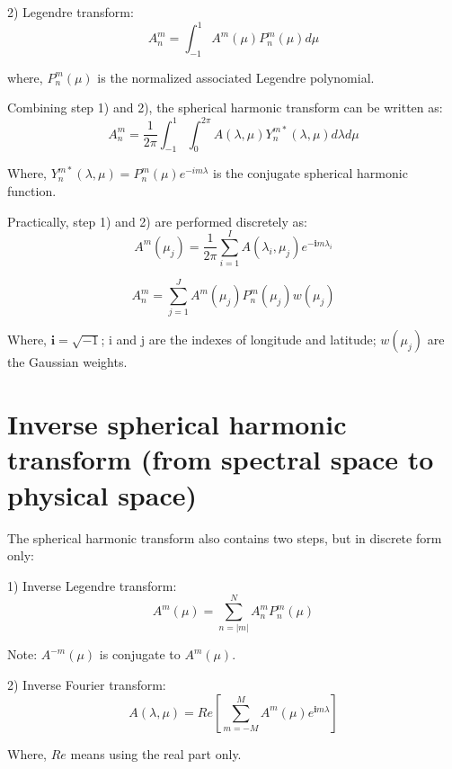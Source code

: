\documentclass[12pt,a4paper]{book}
\begin{document}
2) Legendre transform:
	\begin{equation} \label{eq:legendre}
	A_n^m = \int_{-1}^1 A^m(\mu) P_n^m(\mu) d\mu
	\end{equation}

where, $P_n^m(\mu)$ is the normalized associated Legendre polynomial.

Combining step 1) and 2), the spherical harmonic transform can be written as:
	\begin{equation} \label{eq:harmonic}
	A_n^m = \frac{1}{2\pi} \int_{-1}^1 \int_0^{2\pi} A(\lambda, \mu ) Y_n^{m*}(\lambda, \mu) d\lambda d\mu
	\end{equation} 

Where, $Y_n^{m*}(\lambda, \mu) = P_n^m(\mu ) e^{-im\lambda}$ is the conjugate spherical harmonic function.

Practically, step 1) and 2) are performed discretely as:
	\begin{equation} \label{eq:disfft}
		A^m(\mu_j) = \frac{1}{2\pi} \sum_{i=1}^I A(\lambda_i, \mu_j) e^{-\textbf{i}m\lambda_i}
	\end{equation}	
	
	\begin{equation} \label{eq:dislegendre}
		A_n^m = \sum_{j=1}^J A^m(\mu_j) P_n^m(\mu_j) w(\mu_j)
	\end{equation}

Where, $\textbf{i} = \sqrt{-1}$;  i and j are the indexes of longitude and latitude; $w(\mu_j)$ are the Gaussian weights.

\section{Inverse spherical harmonic transform (from spectral space to physical space)}

The spherical harmonic transform also contains two steps, but in discrete form only:

1) Inverse Legendre transform:
	\begin{equation}	
	A^m(\mu) = \sum\limits_{n=|m|}^N  A_n^m P_n^m(\mu)		
	\end{equation}

Note: $A^{-m}(\mu)$ is conjugate to $A^m(\mu)$.

2) Inverse Fourier transform:
	\begin{equation}	
	A(\lambda, \mu) = Re\left[\sum_{m=-M}^M A^m(\mu)	e^{\textbf{i}m\lambda} \right] 
	\end{equation}

Where, $Re$ means using the real part only. 
\end{document}
